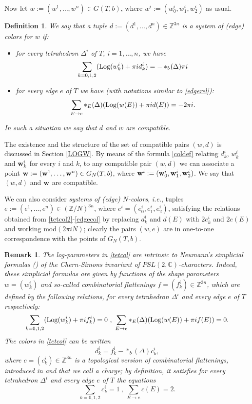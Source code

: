 \documentclass[11pt]{amsart}
\newtheorem{defi}[teo]{Definition}
\newtheorem{remark}[teo]{Remark}
\newcommand{\mc}{\mathbb{C}}
\newcommand{\mz}{\mathbb{Z}}
\newcommand{\bw}{{\bf w}}
\newcommand{\Log}{{\rm Log}}
\newcommand{\ra}{\rightarrow}
\begin{document}
Now let $w:=(w^1,\ldots,w^n)\in  G(T,b)$, where $w^i:=(w_0^i,w_1^i,w_2^i)$ as usual. 
\begin{defi} {\rm We say that a tuple $d:=(d^1,\ldots,d^n)\in \mz^{3n}$ is a {\it system of (edge) colors} for $w$ if: 
\begin{itemize}
\item for every tetrahedron $\Delta^i$ of $T$, $i=1,\ldots,n$, we have 
\begin{equation}\label{tetcol2}
\sum_{k=0,1,2} (\Log(w_k^i) +\pi i d_k^i) = -*_b\! (\Delta)\pi i 
\end{equation}
\item for every edge $e$ of $T$ we have (with notations similar to \eqref{edgerel}):
\begin{equation}\label{edgecol}
\sum_{E\ra e} *_E(\Delta)(\Log(w(E)) +\pi i d(E)) =  -2\pi i.
\end{equation}
\end{itemize}
In such a situation we say that $d$ and $w$ are {\it compatible}. }
\end{defi}
The existence and the structure of the set of compatible pairs $(w,d)$ is discussed in Section \ref{LOGW}. By means of the formula \eqref{coldef} relating $d_k^i$, $w_k^i$ and $\bw_k^i$ for every $i$ and $k$, to any compatible pair $(w,d)$ we can associate a point $\bw:=(\bw^1,\ldots,\bw^n)\in G_N(T,b)$, where $\bw^i:=(\bw_0^i,\bw_1^i,\bw_2^i)$. We say that $(w,d)$ and $\bw$ are compatible.

We can also consider {\it systems of (edge) $N$-colors}, {\it i.e.}, tuples $e:=(e^1,\ldots,e^n)\in (\mz/N)^{3n}$, where $e^i=(e_0^i,e_1^i,e_2^i)$, satisfying the relations obtained from \eqref{tetcol2}-\eqref{edgecol} by replacing $d_k^i$ and $d(E)$ with $2e_k^i$ and $2e(E)$ and working {\rm mod}$(2\pi i N)$; clearly the pairs $(w,e)$ are in one-to-one correspondence with the points of $G_N(T,b)$. 

\begin{remark}\label{defflatcharge}{\rm The log-parameters in \eqref{tetcol} are intrinsic to Neumann's simplicial formulas (\cite{N}) of the Chern-Simons invariant of $PSL(2,\mc)$-characters. Indeed, these simplicial formulas are given by functions of the shape parameters $w=(w_k^i)$ and so-called {\it combinatorial flattenings} $f=(f_k^i)\in \mz^{3n}$, which are defined by the following relations, for every tetrahedron $\Delta^i$ and every edge $e$ of $T$ respectively:
\begin{equation}\label{rellogparoct25}
\sum_{k=0,1,2} (\Log(w_k^i) +\pi i f_k^i) = 0\ ,\ \sum_{E\ra e} *_E(\Delta)(\Log(w(E)) +\pi i f(E)) = 0.
\end{equation}
The colors in \eqref{tetcol} can be written
\begin{equation}\label{expdfc}
d_k^i=f_k^i- *_b (\Delta) c_k^i,
\end{equation}
where $c=(c_k^i)\in \mz^{3n}$ is a topological version of combinatorial flattenings, introduced in \cite{N0} and that we call a charge; by definition, it satisfies for every tetrahedron $\Delta^i$ and every edge $e$ of $T$ the equations} 
$$\sum_{k=0,1,2} c_k^i = 1\ ,\ \sum_{E\ra e} c(E) = 2.$$
\end{remark}
\end{document}

